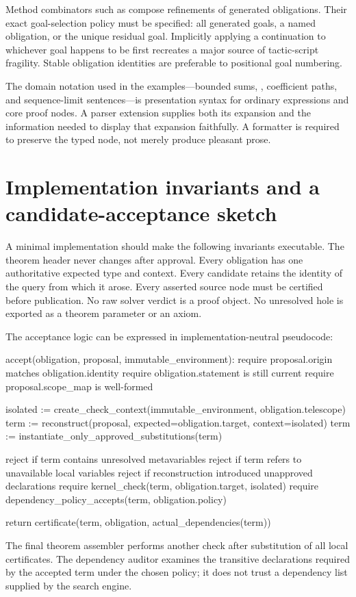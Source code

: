 \documentclass[11pt,letterpaper]{article}
\theoremstyle{definition}
\theoremstyle{remark}
\newcommand{\code}[1]{\texttt{\detokenize{#1}}}
\begin{document}
Method combinators such as \code{then} compose refinements of generated obligations. Their exact goal-selection policy must be specified: all generated goals, a named obligation, or the unique residual goal. Implicitly applying a continuation to whichever goal happens to be first recreates a major source of tactic-script fragility. Stable obligation identities are preferable to positional goal numbering.

The domain notation used in the examples---bounded sums, \code{retain only}, coefficient paths, and sequence-limit sentences---is presentation syntax for ordinary expressions and core proof nodes. A parser extension supplies both its expansion and the information needed to display that expansion faithfully. A formatter is required to preserve the typed node, not merely produce pleasant prose.

\section{Implementation invariants and a candidate-acceptance sketch}
\label{app:algorithm}
A minimal implementation should make the following invariants executable. The theorem header never changes after approval. Every obligation has one authoritative expected type and context. Every candidate retains the identity of the query from which it arose. Every asserted source node must be certified before publication. No raw solver verdict is a proof object. No unresolved hole is exported as a theorem parameter or an axiom.

The acceptance logic can be expressed in implementation-neutral pseudocode:
\par\noindent\begin{minipage}{\linewidth}
\begin{Code}
accept(obligation, proposal, immutable_environment):
    require proposal.origin matches obligation.identity
    require obligation.statement is still current
    require proposal.scope_map is well-formed

    isolated := create_check_context(immutable_environment,
                                     obligation.telescope)
    term := reconstruct(proposal, expected=obligation.target,
                        context=isolated)
    term := instantiate_only_approved_substitutions(term)

    reject if term contains unresolved metavariables
    reject if term refers to unavailable local variables
    reject if reconstruction introduced unapproved declarations
    require kernel_check(term, obligation.target, isolated)
    require dependency_policy_accepts(term, obligation.policy)

    return certificate(term, obligation, actual_dependencies(term))
\end{Code}
\end{minipage}\par\smallskip
The final theorem assembler performs another check after substitution of all local certificates. The dependency auditor examines the transitive declarations required by the accepted term under the chosen policy; it does not trust a dependency list supplied by the search engine.
\end{document}
